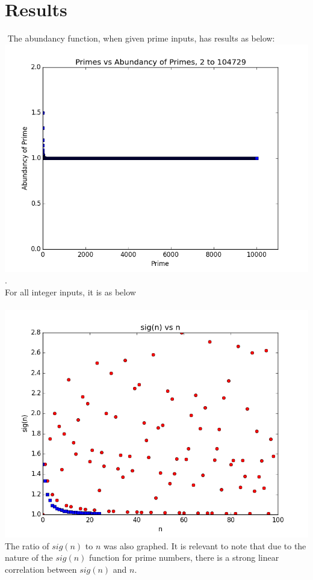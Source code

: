 \documentclass[11pt]{article}
\begin{document}
\section{Results}$ $
The abundancy function, when given prime inputs, has results as below:
\includegraphics[scale=0.5]{figure_1.png}. 
\\ For all integer inputs, it is as below \\ \\
\includegraphics[scale=0.5]{with_primes_small.png}
\\ The ratio of $sig(n)$ to $n$ was also graphed. It is relevant to note that due to the nature of the $sig(n)$ function for prime numbers, there is a strong linear correlation between $sig(n)$ and $n$.
\end{document}
